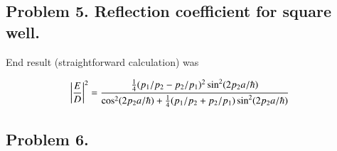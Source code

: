 \subsection{Problem 5. Reflection coefficient for square well. }

End result (straightforward calculation) was

\begin{align*}
\left\lvert{\frac{E}{D}}\right\rvert^2 &= \frac{\frac{1}{4}(p_1/p_2 - p_2/p_1)^2 \sin^2( 2 p_2 a /\hbar)}{\cos^2(2 p_2 a/\hbar) + \frac{1}{4}(p_1/p_2 + p_2/p_1) \sin^2(2 p_2 a/\hbar)}
\end{align*}

\subsection{Problem 6. }

%
%

%
